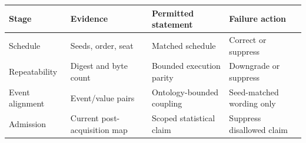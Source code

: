 \begin{tabular}{llll}
\toprule
Stage & Evidence & Permitted statement & Failure action \\
\midrule
Schedule & Seeds, order, seat & Matched schedule & Correct or suppress \\
Repeatability & Digest and byte count & Bounded execution parity & Downgrade or suppress \\
Event alignment & Event/value pairs & Ontology-bounded coupling & Seed-matched wording only \\
Admission & Current post-acquisition map & Scoped statistical claim & Suppress disallowed claim \\
\bottomrule
\end{tabular}
